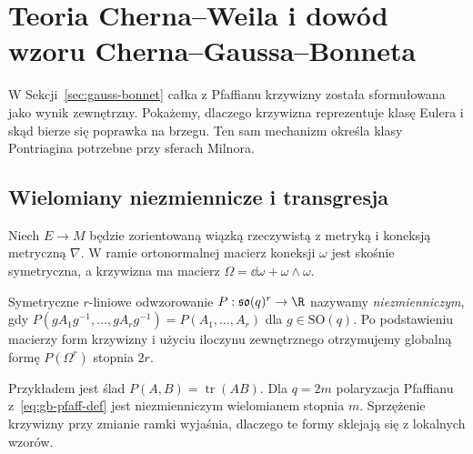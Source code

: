 \chapter{Teoria Cherna--Weila i dowód wzoru Cherna--Gaussa--Bonneta}
\label{ch:chern-weil}

W Sekcji~\ref{sec:gauss-bonnet} całka z Pfaffianu
krzywizny została sformułowana jako wynik
zewnętrzny. Pokażemy, dlaczego krzywizna
reprezentuje klasę Eulera i skąd bierze się
poprawka na brzegu. Ten sam mechanizm określa
klasy Pontriagina potrzebne przy sferach Milnora.

\section{Wielomiany niezmiennicze i transgresja}
\label{sec:chern-weil-26}

Niech $E\to M$ będzie zorientowaną wiązką
rzeczywistą z metryką i koneksją metryczną
$\nabla$. W ramie ortonormalnej macierz
koneksji $\omega$ jest skośnie symetryczna,
a krzywizna ma macierz
$\Omega=\dd\omega+\omega\wedge\omega$.

\begin{definicja}
\label{def:invariant-polynomial-26}
Symetryczne $r$-liniowe odwzorowanie
$P:\mathfrak{so}(q)^r\to\R$ nazywamy
\emph{niezmienniczym}, gdy
$P(gA_1g^{-1},\ldots,gA_rg^{-1})
=P(A_1,\ldots,A_r)$ dla $g\in\mathrm{SO}(q)$.
Po podstawieniu macierzy form krzywizny
i użyciu iloczynu zewnętrznego otrzymujemy
globalną formę $P(\Omega^r)$ stopnia $2r$.
\end{definicja}

Przykładem jest ślad $P(A,B)=\operatorname{tr}(AB)$.
Dla $q=2m$ polaryzacja Pfaffianu
z~\eqref{eq:gb-pfaff-def} jest
niezmienniczym wielomianem stopnia $m$.
Sprzężenie krzywizny przy zmianie ramki
wyjaśnia, dlaczego te formy sklejają się
z lokalnych wzorów.

